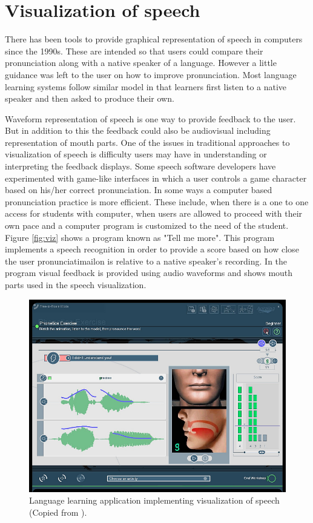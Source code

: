 \documentclass[11pt,a4paper,oneside,article]{memoir}
\begin{document}
\section{Visualization of speech}
There has been tools to provide graphical representation of speech in computers since the 1990s. These are intended so that users could compare their pronunciation along with a native speaker of a language. However a little guidance was left to the user on how to improve pronunciation. Most language learning systems follow similar model in that learners first listen to a native speaker and then asked to produce their own.

Waveform representation of speech is one way to provide feedback to the user. But in addition to this the feedback could also be audiovisual including representation of mouth parts. One of the issues in traditional approaches to visualization of speech is difficulty users may have in understanding or interpreting the feedback displays. Some speech software developers have experimented with game-like interfaces in which a user controls a game character based on his/her correct pronunciation. In some ways a computer based pronunciation practice is more efficient. These include, when there is a one to one access for students with computer, when users are allowed to proceed with their own pace and a computer program is customized to the need of the student.\cite{rob}\\

Figure \vref{fig:viz} shows a program known as "Tell me more". This program implements a speech recognition in order to provide a score based on how close the user pronunciatimailon is relative to a native speaker's recording. In the program visual feedback is provided using audio waveforms and shows mouth parts used in the speech visualization.

\begin{figure}[h]

  \includegraphics[width=12cm]{viz}
  \caption{Language learning application implementing visualization of speech (Copied from \cite{tellmemore}).}
  \label{fig:viz}
\end{figure}
\end{document}
